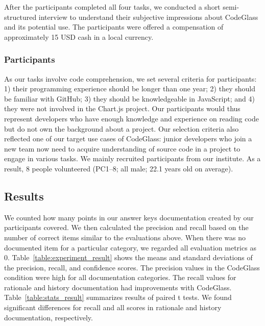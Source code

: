 After the participants completed all four tasks, we conducted a short semi-structured interview to understand their subjective impressions about CodeGlass and its potential use.
The participants were offered a compensation of approximately 15 USD cash in a local currency.

\subsubsection{Participants}

As our tasks involve code comprehension, we set several criteria for participants: 1) their programming experience should be longer than one year; 2) they should be familiar with GitHub; 3) they should be knowledgeable in JavaScript; and 4) they were not involved in the Chart.js project.
Our participants would thus represent developers who have enough knowledge and experience on reading code but do not own the background about a project.
Our selection criteria also reflected one of our target use cases of CodeGlass: junior developers who join a new team now need to acquire understanding of source code in a project to engage in various tasks.
We mainly recruited participants from our institute.
As a result, 8 people volunteered (PC1--8; all male; 22.1 years old on average).

 

\subsection{Results}


We counted how many points in our answer keys documentation created by our participants covered.
We then calculated the precision and recall based on the number of correct items similar to the evaluations above.
When there was no documented item for a particular category, we regarded all evaluation metrics as 0.
Table~\ref{table:experiment_result} shows the means and standard deviations of the precision, recall, and confidence scores.
The precision values in the CodeGlass condition were high for all documentation categories.
The recall values for rationale and history documentation had improvements with CodeGlass.
Table~\ref{table:stats_result} summarizes results of paired t tests.
We found significant differences for recall and all scores in rationale and history documentation, respectively.

